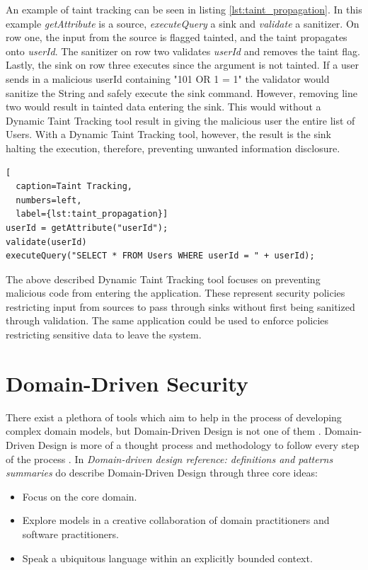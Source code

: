An example of taint tracking can be seen in listing \ref{lst:taint_propagation}. In this example \textit{getAttribute} is a source, \textit{executeQuery} a sink and \textit{validate} a sanitizer. On row one, the input from the source is flagged tainted, and the taint propagates onto \textit{userId}. The sanitizer on row two validates \textit{userId} and removes the taint flag. Lastly, the sink on row three executes since the argument is not tainted. If a user sends in a malicious userId containing "101 OR 1 = 1" the validator would sanitize the String and safely execute the sink command. However, removing line two would result in tainted data entering the sink. This would without a Dynamic Taint Tracking tool result in giving the malicious user the entire list of Users. With a Dynamic Taint Tracking tool, however, the result is the sink halting the execution, therefore, preventing unwanted information disclosure.

\hfill
\begin{lstlisting}[
  caption=Taint Tracking,
  numbers=left,
  label={lst:taint_propagation}]
userId = getAttribute("userId");
validate(userId)
executeQuery("SELECT * FROM Users WHERE userId = " + userId);
\end{lstlisting}
\hfill

The above described Dynamic Taint Tracking tool focuses on preventing malicious code from entering the application. These represent security policies restricting input from sources to pass through sinks without first being sanitized through validation. The same application could be used to enforce policies restricting sensitive data to leave the system.



\section{Domain-Driven Security}
\label{DomainDrivenSecurity}
There exist a plethora of tools which aim to help in the process of developing complex domain models, but Domain-Driven Design is not one of them \parencite{Bankes, 10.1007/978-3-319-24309-2_33}. Domain-Driven Design is more of a thought process and methodology to follow every step of the process \parencite{EvansEric2004Dd:t}. In \emph{Domain-driven design reference: definitions and patterns summaries} do \textcite{evans_2015} describe Domain-Driven Design through three core ideas:

\begin{itemize}
    \item Focus on the core domain.
    \item Explore models in a creative collaboration of domain practitioners and software practitioners.
    \item Speak a ubiquitous language within an explicitly bounded context.
\end{itemize}

